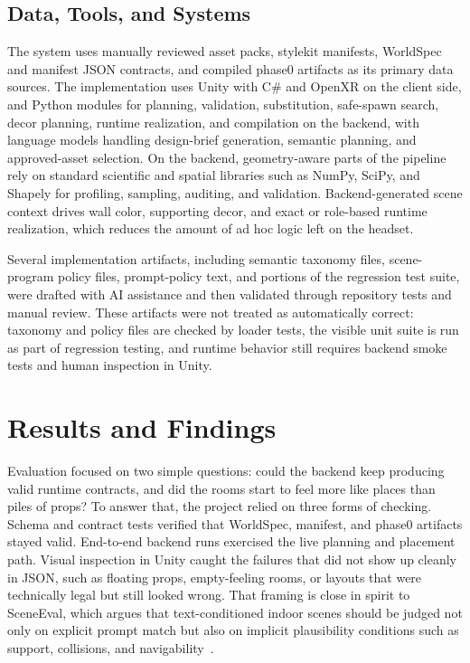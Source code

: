 \documentclass[12pt]{article}
\begin{document}
\subsection{Data, Tools, and Systems}
The system uses manually reviewed asset packs, stylekit manifests, WorldSpec and manifest JSON contracts, and compiled phase0 artifacts as its primary data sources. The implementation uses Unity with C\# and OpenXR on the client side, and Python modules for planning, validation, substitution, safe-spawn search, decor planning, runtime realization, and compilation on the backend, with language models handling design-brief generation, semantic planning, and approved-asset selection. On the backend, geometry-aware parts of the pipeline rely on standard scientific and spatial libraries such as NumPy, SciPy, and Shapely for profiling, sampling, auditing, and validation. Backend-generated scene context drives wall color, supporting decor, and exact or role-based runtime realization, which reduces the amount of ad hoc logic left on the headset.

Several implementation artifacts, including semantic taxonomy files, scene-program policy files, prompt-policy text, and portions of the regression test suite, were drafted with AI assistance and then validated through repository tests and manual review. These artifacts were not treated as automatically correct: taxonomy and policy files are checked by loader tests, the visible unit suite is run as part of regression testing, and runtime behavior still requires backend smoke tests and human inspection in Unity.

\section{Results and Findings}
Evaluation focused on two simple questions: could the backend keep producing valid runtime contracts, and did the rooms start to feel more like places than piles of props? To answer that, the project relied on three forms of checking. Schema and contract tests verified that WorldSpec, manifest, and phase0 artifacts stayed valid. End-to-end backend runs exercised the live planning and placement path. Visual inspection in Unity caught the failures that did not show up cleanly in JSON, such as floating props, empty-feeling rooms, or layouts that were technically legal but still looked wrong. That framing is close in spirit to SceneEval, which argues that text-conditioned indoor scenes should be judged not only on explicit prompt match but also on implicit plausibility conditions such as support, collisions, and navigability~\cite{Tam_2026_WACV_SceneEval}.
\end{document}
